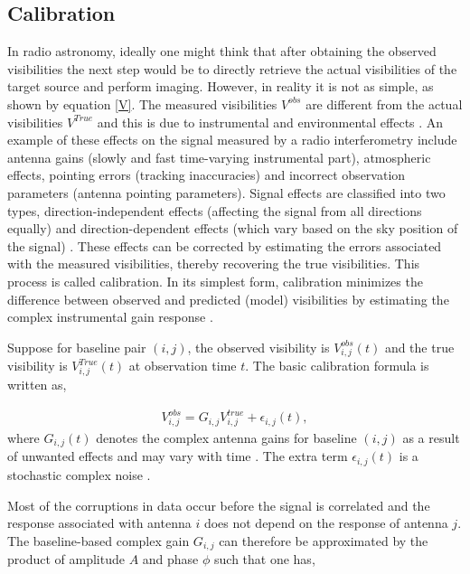 \subsection{Calibration}
\label{Calib}
In radio astronomy, ideally one might think that after obtaining the observed visibilities the next step would be to directly retrieve the actual visibilities of the target source and perform imaging. However, in reality it is not as simple, as shown by equation \ref{V}. The measured visibilities $V^{obs}$ are different from the actual visibilities $V^{True}$ and this is due to instrumental and environmental effects \citep{thompson2017interferometry}. An example of these effects on the signal measured by a radio interferometry include antenna gains (slowly and fast time-varying instrumental part), atmospheric effects, pointing errors (tracking inaccuracies) and incorrect observation parameters (antenna pointing parameters). Signal effects are classified into two types, direction-independent effects (affecting the signal from all directions equally) and direction-dependent effects (which vary based on the sky position of the signal) \citep{taylor1999synthesis}. These effects can be corrected by estimating the errors associated with the measured visibilities, thereby recovering the true visibilities. This process is called calibration. In its simplest form, calibration minimizes the difference between observed and predicted (model) visibilities by estimating the complex instrumental gain response \citep{grobler2016calibration}. 

Suppose for baseline pair $(i,j)$, the observed visibility is $V^{obs}_{i,j}(t)$ and the true visibility is $V^{True}_{i,j}(t)$ at observation time $t$. The basic calibration formula is written as,

\begin{align}
V_{i,j}^{obs}=G_{i,j} V_{i,j}^{true} + \epsilon_{i,j}(t) ,
\end{align}
where $G_{i,j}(t)$ denotes the complex antenna gains for baseline $(i,j)$ as a result of unwanted effects and may vary with time \citep{thompson2001interferometry}. The extra term $ \epsilon_{i,j}(t)$ is a stochastic complex noise \citep{taylor1999synthesis}.

Most of the corruptions in data occur before the signal is correlated and the response associated with antenna  $i$  does not depend on the response of antenna $j$. The baseline-based complex gain $G_{i,j}$ can therefore be approximated by the product of amplitude $A$ and phase $\phi$ such that one has,  

